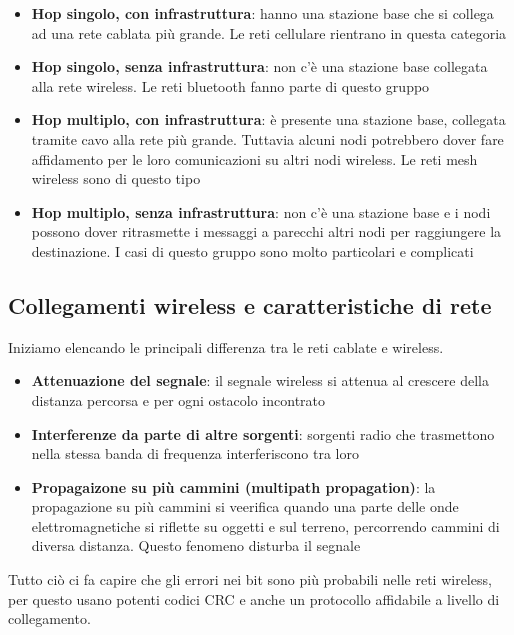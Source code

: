 \documentclass[11pt,a4paper]{article}
\begin{document}
{\begin{itemize}
	\item \textbf{Hop singolo, con infrastruttura}: hanno una stazione base che si collega ad una rete cablata più grande. Le reti cellulare rientrano in questa categoria
	\item \textbf{Hop singolo, senza infrastruttura}: non c'è una stazione base collegata alla rete wireless. Le reti bluetooth fanno parte di questo gruppo
	\item \textbf{Hop multiplo, con infrastruttura}: è presente una stazione base, collegata tramite cavo alla rete più grande. Tuttavia alcuni nodi potrebbero dover fare affidamento per le loro comunicazioni su altri nodi wireless. Le reti mesh wireless sono di questo tipo
	\item \textbf{Hop multiplo, senza infrastruttura}: non c'è una stazione base e i nodi possono dover ritrasmette i messaggi a parecchi altri nodi per raggiungere la destinazione.  I casi di questo gruppo sono molto particolari e complicati
\end{itemize}

\subsection{Collegamenti wireless e caratteristiche di rete}
Iniziamo elencando le principali differenza tra le reti cablate e wireless.
\begin{itemize}
	\item \textbf{Attenuazione del segnale}: il segnale wireless si attenua al crescere della distanza percorsa e per ogni ostacolo incontrato
	\item \textbf{Interferenze da parte di altre sorgenti}: sorgenti radio che trasmettono nella stessa banda di frequenza interferiscono tra loro
	\item \textbf{Propagaizone su più cammini (multipath propagation)}: la propagazione su più cammini si veerifica quando una parte delle onde elettromagnetiche si riflette su oggetti e sul terreno, percorrendo cammini di diversa distanza. Questo fenomeno disturba il segnale
\end{itemize}

Tutto ciò ci fa capire che gli errori nei bit sono più probabili nelle reti wireless, per questo usano potenti codici CRC e anche un protocollo affidabile a livello di collegamento.

}
\end{document}
